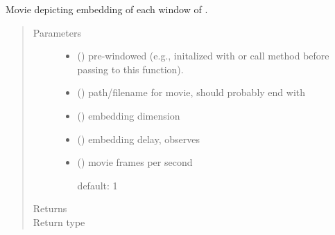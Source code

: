 \documentclass[letterpaper,10pt,openany,oneside,english]{sphinxmanual}
\begin{document}

\begin{fulllineitems}
\label{\detokenize{embed:embed.movies.slide_window}}
Movie depicting embedding of each window of .
\begin{quote}\begin{description}
\item[{Parameters}] \leavevmode\begin{itemize}
\item {} 
 ({\hyperref[\detokenize{signals:signals.TimeSeries}]{}}) \textendash{} pre-windowed (e.g., initalized with  or call 
method before passing to this function).

\item {} 
 () \textendash{} path/filename for movie, should probably end with 

\item {} 
 () \textendash{} embedding dimension

\item {} 
 () \textendash{} embedding delay, observes 

\item {} 
 (\sphinxstyleliteralemphasis{, }) \textendash{} 
movie frames per second

default: 1


\end{itemize}

\item[{Returns}] \leavevmode


\item[{Return type}] \leavevmode
{\hyperref[\detokenize{signals:signals.Trajectory}]{}}

\end{description}\end{quote}

\end{fulllineitems}
\end{document}
